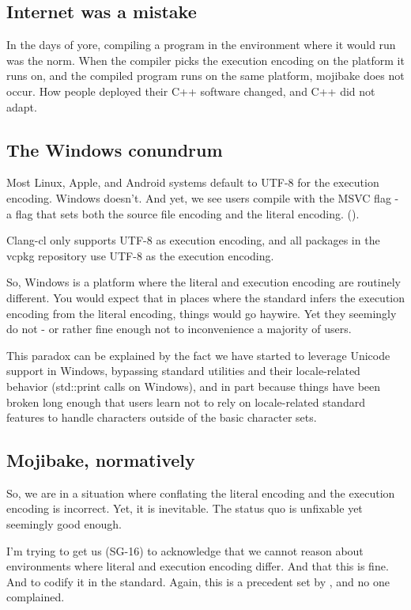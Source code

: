 \documentclass{wg21}
\begin{document}
\subsection{Internet was a mistake}

In the days of yore, compiling a program in the environment where it would run was the norm.
When the compiler picks the execution encoding on the platform it runs on, and the compiled program runs on the same platform,
mojibake does not occur.
How people deployed their C++ software changed, and C++ did not adapt.

\subsection{The Windows conundrum}

Most Linux, Apple, and Android systems default to UTF-8 for the execution encoding.
Windows doesn't.
And yet, we see users compile with the  MSVC flag - a flag that sets both the source file encoding and the literal encoding.
().

Clang-cl only supports UTF-8 as execution encoding, and all packages in the vcpkg repository use UTF-8 as the execution encoding.

So, Windows is a platform where the literal and execution encoding are routinely different.
You would expect that in places where the standard infers the execution encoding from the literal encoding, things would go haywire.
Yet they seemingly do not - or rather fine enough not to inconvenience a majority of users.

This paradox can be explained by the fact we have started to leverage Unicode support in Windows, bypassing standard utilities and their
locale-related behavior (std::print calls  on Windows), and in part because things have been broken long enough
that users learn not to rely on locale-related standard features to handle characters outside of the basic character sets.

\subsection{Mojibake, normatively}

So, we are in a situation where conflating the literal encoding and the execution encoding is incorrect.
Yet, it is inevitable. The status quo is unfixable yet seemingly good enough.

I'm trying to get us (SG-16) to acknowledge that we cannot reason about environments
where literal and execution encoding differ. And that this is fine. And to codify it in the standard.
Again, this is a precedent set by , and no one complained.
\end{document}
